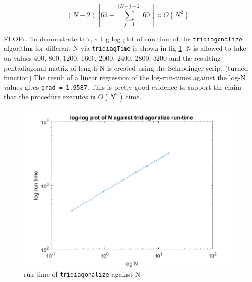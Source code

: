 \documentclass[paper=a4, fontsize=12pt]{scrartcl} %
\numberwithin{equation}{section}       %
\numberwithin{figure}{section}         %
\numberwithin{table}{section}          %
\begin{document}
$$
(N-2)[65 + \sum_{j=1}^{\lfloor N - j - 2 \rfloor} 60] \approx O(N^2) 
$$

\noindent FLOPs. To demonstrate this, a log-log plot of run-time of the \texttt{tridiagonalize} algorithm for different N via \texttt{tridiagTime} is shown in fig \ref{fig:log-log_tridiag}. N is allowed to take on values 400, 800, 1200, 1600, 2000, 2400, 2800, 3200 and the resulting pentadiagonal matrix of length N is created using the Schrodinger script (turned function) The result of a linear regression of the log-run-times against the log-N values gives \texttt{grad = 1.9587}. This is pretty good evidence to support the claim that the procedure executes in $O(N^2)$ time. 


\begin{center}
	\begin{figure}[h!]
	  \includegraphics[width=\linewidth]{log-log_tridiag}
	  \caption{run-time of \texttt{tridiagonalize} against N}
	  \label{fig:log-log_tridiag}
	\end{figure}
\end{center}
\end{document}
